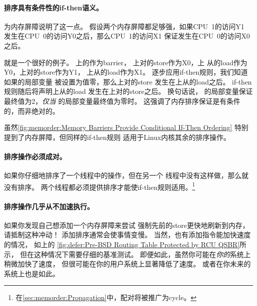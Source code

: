 \paragraph{排序具有条件性的if-then语义。}
为内存屏障说明了这一点。
假设两个内存屏障都足够强，如果CPU~1的访问Y1
发生在CPU~0的访问Y0之后，那么CPU~1的访问X1
保证发生在CPU~0的访问X0之后。

\QuickQuizEnd

\begin{fcvref}
就是一个很好的例子。
上的作为barrier，
上对的store作为X0，上
从的load作为Y0，上对的store作为Y1，
上从的load作为X1。
逐步应用if-then规则，我们知道如果的局部变量
被设置为值零，那么上对的store
发生在上从的load之后。
if-then规则随后将声明上从的load
发生在上对的store之后。
换句话说，
的局部变量保证
最终值为2，\emph{仅当}
的局部变量最终值为零时。
这强调了内存排序保证是有条件的，而非绝对的。
\end{fcvref}

虽然\cref{fig:memorder:Memory Barriers Provide Conditional If-Then Ordering}
特别提到了内存屏障，但同样的if-then规则
适用于Linux内核其余的排序操作。

\paragraph{排序操作必须成对。}
如果你仔细地排序了一个线程中的操作，但在另一个
线程中没有这样做，那么就没有排序。
两个线程都必须提供排序才能使if-then规则适用。\footnote{
	在\cref{sec:memorder:Propagation}中，配对将被推广为cycle。}

\paragraph{排序操作几乎从不加速执行。}
如果你发现自己想添加一个内存屏障来尝试
强制先前的store更快地刷新到内存，请抵制这种冲动！
添加排序通常会使事情变慢。
当然，也有添加指令能加快速度的情况，
如上的
\cref{fig:defer:Pre-BSD Routing Table Protected by RCU QSBR}所示，
但在这种情况下需要仔细的基准测试。
即便如此，虽然你可能在\emph{你的}系统上稍微加快了速度，
但很可能在你的用户系统上显著降低了速度。
或者在你未来的系统上也是如此。

